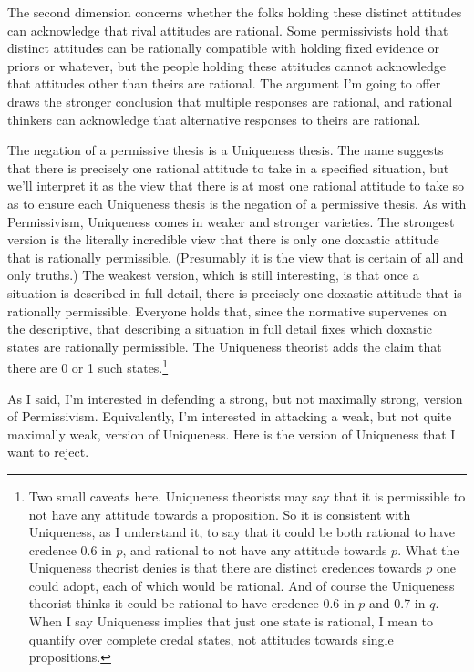 \documentclass[12pt,]{article}
\let\rmarkdownfootnote\footnote%
\def\footnote{\protect\rmarkdownfootnote}
\begin{document}
The second dimension concerns whether the folks holding these distinct attitudes can acknowledge that rival attitudes are rational. Some permissivists hold that distinct attitudes can be rationally compatible with holding fixed evidence or priors or whatever, but the people holding these attitudes cannot acknowledge that attitudes other than theirs are rational. The argument I'm going to offer draws the stronger conclusion that multiple responses are rational, and rational thinkers can acknowledge that alternative responses to theirs are rational.

The negation of a permissive thesis is a Uniqueness thesis. The name suggests that there is precisely one rational attitude to take in a specified situation, but we'll interpret it as the view that there is at most one rational attitude to take so as to ensure each Uniqueness thesis is the negation of a permissive thesis. As with Permissivism, Uniqueness comes in weaker and stronger varieties. The strongest version is the literally incredible view that there is only one doxastic attitude that is rationally permissible. (Presumably it is the view that is certain of all and only truths.) The weakest version, which is still interesting, is that once a situation is described in full detail, there is precisely one doxastic attitude that is rationally permissible. Everyone holds that, since the normative supervenes on the descriptive, that describing a situation in full detail fixes which doxastic states are rationally permissible. The Uniqueness theorist adds the claim that there are 0 or 1 such states.\footnote{Two small caveats here. Uniqueness theorists may say that it is permissible to not have any attitude towards a proposition. So it is consistent with Uniqueness, as I understand it, to say that it could be both rational to have credence 0.6 in \(p\), and rational to not have any attitude towards \(p\). What the Uniqueness theorist denies is that there are distinct credences towards \(p\) one could adopt, each of which would be rational. And of course the Uniqueness theorist thinks it could be rational to have credence 0.6 in \(p\) and 0.7 in \(q\). When I say Uniqueness implies that just one state is rational, I mean to quantify over complete credal states, not attitudes towards single propositions.}

As I said, I'm interested in defending a strong, but not maximally strong, version of Permissivism. Equivalently, I'm interested in attacking a weak, but not quite maximally weak, version of Uniqueness. Here is the version of Uniqueness that I want to reject.
\end{document}
